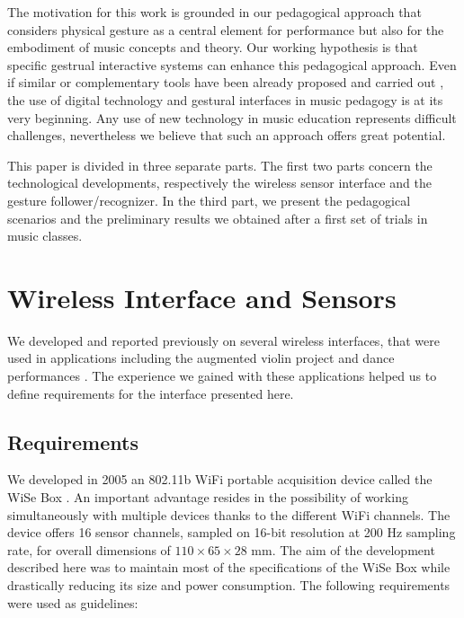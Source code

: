 The motivation for this work is grounded in our pedagogical approach that considers physical gesture \cite{Iazzetta:2000} as a central element for performance but also for the embodiment of music concepts and theory. Our working hypothesis is that specific gestrual interactive systems can enhance this pedagogical approach. Even if similar or complementary tools have been already proposed and carried out \cite{Ferguson:2006,Guedy:2006,Lee:2006,Lee:2006a,Machover:2004,Puig:2005}, the use of digital technology and gestural interfaces in music pedagogy is at its very beginning.  Any use of new technology in music education represents difficult challenges, nevertheless we believe that such an approach offers great potential.

This paper is divided in three separate parts. The first two parts concern the technological developments, respectively the wireless sensor interface and the gesture follower/recognizer. In the third part, we present the pedagogical scenarios and the preliminary results we obtained after a first set of trials in music classes. 

\section{Wireless Interface and Sensors}

We developed and reported previously on several wireless interfaces, that were used in applications including the augmented violin project \cite{Bevilacqua:2006} and dance performances \cite{Flety:2005}. The experience we gained with these applications helped us to define requirements for the interface presented here.
\subsection{Requirements}
We developed in 2005 an 802.11b WiFi portable acquisition device called the WiSe Box \cite{Flety:2005}. An important advantage resides in the possibility of working simultaneously with multiple devices thanks to the different WiFi channels. The device offers 16 sensor channels, sampled on 16-bit resolution at 200 Hz sampling rate, for overall dimensions of $110\times65\times28$ mm. 
The aim of the development described here was to maintain most of the specifications of the WiSe Box while drastically reducing its size and power consumption. The following requirements were used as guidelines:


